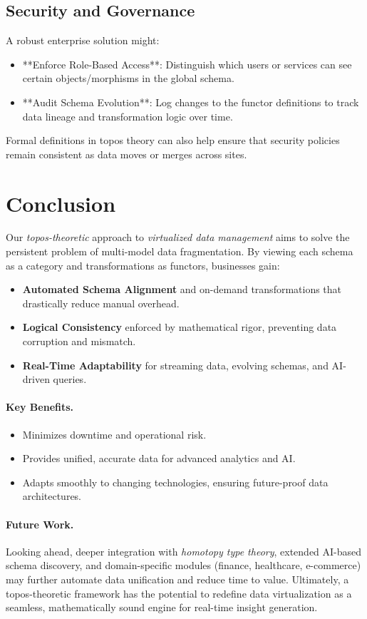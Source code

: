 \documentclass[11pt]{article}
\begin{document}
\subsection{Security and Governance}
A robust enterprise solution might:
\begin{itemize}
\item **Enforce Role-Based Access**: Distinguish which users or services can see certain objects/morphisms in the global schema.
\item **Audit Schema Evolution**: Log changes to the functor definitions to track data lineage and transformation logic over time.
\end{itemize}
Formal definitions in topos theory can also help ensure that security policies remain consistent as data moves or merges across sites.

\section{Conclusion}
Our \emph{topos-theoretic} approach to \emph{virtualized data management} aims to solve the persistent problem of multi-model data fragmentation. By viewing each schema as a category and transformations as functors, businesses gain:
\begin{itemize}
\item \textbf{Automated Schema Alignment} and on-demand transformations that drastically reduce manual overhead.
\item \textbf{Logical Consistency} enforced by mathematical rigor, preventing data corruption and mismatch.
\item \textbf{Real-Time Adaptability} for streaming data, evolving schemas, and AI-driven queries.
\end{itemize}

\paragraph{Key Benefits.}
\begin{itemize}
\item Minimizes downtime and operational risk.
\item Provides unified, accurate data for advanced analytics and AI.
\item Adapts smoothly to changing technologies, ensuring future-proof data architectures.
\end{itemize}

\paragraph{Future Work.}
Looking ahead, deeper integration with \emph{homotopy type theory}, extended AI-based schema discovery, and domain-specific modules (finance, healthcare, e-commerce) may further automate data unification and reduce time to value. Ultimately, a topos-theoretic framework has the potential to redefine data virtualization as a seamless, mathematically sound engine for real-time insight generation.
\end{document}
